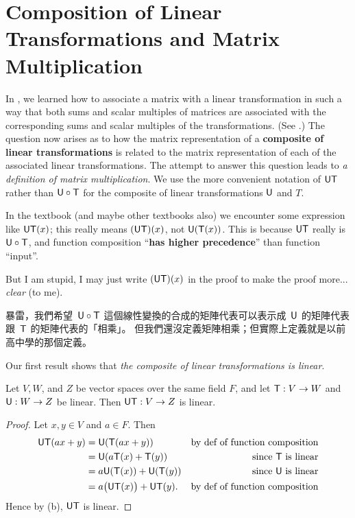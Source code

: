 \section{Composition of Linear Transformations and Matrix Multiplication} \label{sec 2.3}

In , we learned how to associate a matrix with a linear transformation in such a way that both sums and scalar multiples of matrices are associated with the corresponding sums and scalar multiples of the transformations.
(See .)
The question now arises as to how the matrix representation of a \textbf{composite of linear transformations} is related to the matrix representation of each of the associated linear transformations.
The attempt to answer this question leads to \emph{a definition of matrix multiplication}.
We use the more convenient notation of \(\textsf{U}\textsf{T}\) rather than \(\textsf{U} \circ \textsf{T}\) for the composite of linear transformations \(\textsf{U}\) and \(T\).

\begin{remark} \label{remark 2.3.1}
In the textbook (and maybe other textbooks also) we encounter some expression like \(\textsf{U}\textsf{T}(x)\);
this really means \((\textsf{U}\textsf{T})(x)\), not \(\textsf{U}(\textsf{T}(x))\).
This is because \(\textsf{U}\textsf{T}\) really is \(\textsf{U} \circ \textsf{T}\), and function composition ``\textbf{has higher precedence}'' than function ``input''.

But I am stupid, I may just write \((\textsf{U}\textsf{T})(x)\) in the proof to make the proof more... \emph{clear} (to me).
\end{remark}

\begin{note}
暴雷，我們希望\ \(\textsf{U} \circ \textsf{T}\) 這個線性變換的合成的矩陣代表可以表示成\ \(\textsf{U}\) 的矩陣代表跟\ \(\textsf{T}\) 的矩陣代表的「相乘」。
但我們還沒定義矩陣相乘；但實際上定義就是以前高中學的那個定義。
\end{note}

Our first result shows that \emph{the composite of linear transformations is linear}.

\begin{theorem} \label{thm 2.9}
Let \(V, W\), and \(Z\) be vector spaces over the same field \(F\), and let \(\textsf{T}: V \to W\) and \(\textsf{U} : W \to Z\) be linear.
Then \(\textsf{U}\textsf{T} : V \to Z\) is linear.
\end{theorem}

\begin{proof}
Let \(x, y \in V\) and \(a \in F\).
Then
\begin{align*}
    \textsf{U}\textsf{T}(ax + y) & = \textsf{U}(\textsf{T}(ax + y)) & \text{by def of function composition} \\
                 & = \textsf{U}(a\textsf{T}(x) + \textsf{T}(y)) & \text{since \(\textsf{T}\) is linear} \\
                & = a\textsf{U}(\textsf{T}(x)) + \textsf{U}(\textsf{T}(y)) & \text{since \(\textsf{U}\) is linear} \\
                & = a\big( \textsf{U}\textsf{T}(x) \big) + \textsf{U}\textsf{T}(y). & \text{by def of function composition}
\end{align*}
Hence by (b), \(\textsf{U}\textsf{T}\) is linear.
\end{proof}

